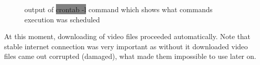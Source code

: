 \begin{enumerate}
\begin{figure}[H]
        \caption{output of \colorbox{Gray}{crontab -l} command which shows what commands execution was scheduled}
        \label{fig:crontabList}
    \end{figure}
\end{enumerate}
At this moment, downloading of video files proceeded automatically. Note that stable internet connection was very important as without it downloaded video files came out corrupted (damaged), what made them impossible to use later on.

